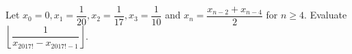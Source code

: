 Let $ x_0=0,x_1=\dfrac{1}{20},x_2=\dfrac{1}{17},x_3=\dfrac{1}{10}$ and $ x_n=\dfrac{x_{n-2}+x_{n-4}}{2}$ for $ n\ge4 $. Evaluate $\left\lfloor\dfrac{1}{x_{2017!}-x_{2017!-1}}\right\rfloor $.
